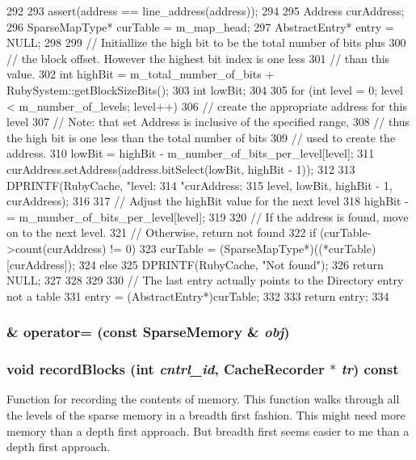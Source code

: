 \begin{DoxyCode}
292 {
293     assert(address == line_address(address));
294 
295     Address curAddress;
296     SparseMapType* curTable = m_map_head;
297     AbstractEntry* entry = NULL;
298 
299     // Initiallize the high bit to be the total number of bits plus
300     // the block offset.  However the highest bit index is one less
301     // than this value.
302     int highBit = m_total_number_of_bits + RubySystem::getBlockSizeBits();
303     int lowBit;
304 
305     for (int level = 0; level < m_number_of_levels; level++) {
306         // create the appropriate address for this level
307         // Note: that set Address is inclusive of the specified range,
308         // thus the high bit is one less than the total number of bits
309         // used to create the address.
310         lowBit = highBit - m_number_of_bits_per_level[level];
311         curAddress.setAddress(address.bitSelect(lowBit, highBit - 1));
312 
313         DPRINTF(RubyCache, "level: %
314                 "curAddress: %
315                 level, lowBit, highBit - 1, curAddress);
316 
317         // Adjust the highBit value for the next level
318         highBit -= m_number_of_bits_per_level[level];
319 
320         // If the address is found, move on to the next level.
321         // Otherwise, return not found
322         if (curTable->count(curAddress) != 0) {
323             curTable = (SparseMapType*)((*curTable)[curAddress]);
324         } else {
325             DPRINTF(RubyCache, "Not found\n");
326             return NULL;
327         }
328     }
329 
330     // The last entry actually points to the Directory entry not a table
331     entry = (AbstractEntry*)curTable;
332 
333     return entry;
334 }
\end{DoxyCode}
\hypertarget{classSparseMemory_a4e634becbab6915935553a70f5714742}{
\subsubsection[{operator=}]{\& operator= (const {\bf SparseMemory} \& {\em obj})}}
\label{classSparseMemory_a4e634becbab6915935553a70f5714742}
\hypertarget{classSparseMemory_a1ab3ef5742c0c4238f90e41d8959603c}{
\subsubsection[{recordBlocks}]{\setlength{\rightskip}{0pt plus 5cm}void recordBlocks (int {\em cntrl\_\-id}, \/  {\bf CacheRecorder} $\ast$ {\em tr}) const}}
\label{classSparseMemory_a1ab3ef5742c0c4238f90e41d8959603c}
Function for recording the contents of memory. This function walks through all the levels of the sparse memory in a breadth first fashion. This might need more memory than a depth first approach. But breadth first seems easier to me than a depth first approach. 


